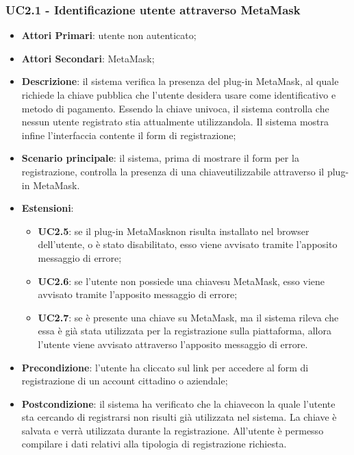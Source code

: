 \subsubsection{UC2.1 - Identificazione utente attraverso MetaMask}
\begin{itemize}
	\item \textbf{Attori Primari}: utente non autenticato;
	\item \textbf{Attori Secondari}: MetaMask\glo;
	\item \textbf{Descrizione}: il sistema verifica la presenza del plug-in MetaMask\glo, al quale richiede la chiave pubblica che l'utente desidera usare come identificativo e metodo di pagamento. Essendo la chiave univoca, il sistema controlla che nessun utente registrato stia attualmente utilizzandola. Il sistema mostra infine l'interfaccia contente il form di registrazione;
	\item \textbf{Scenario principale}: il sistema, prima di mostrare il form per la registrazione, controlla la presenza di una chiave\glosp utilizzabile attraverso il plug-in MetaMask\glosp.
	\item \textbf{Estensioni}:
	\begin{itemize}
		\item \textbf{UC2.5}: se il plug-in MetaMask\glosp non risulta installato nel browser dell'utente, o è stato disabilitato, esso viene avvisato tramite l'apposito messaggio di errore;
		\item \textbf{UC2.6}: se l'utente non possiede una chiave\glosp su MetaMask\glosp, esso viene avvisato tramite l'apposito messaggio di errore;
		\item \textbf{UC2.7}: se è presente una chiave su MetaMask\glosp, ma il sistema rileva che essa è già stata utilizzata per la registrazione sulla piattaforma, allora l'utente viene avvisato attraverso l'apposito messaggio di errore.
	\end{itemize}
	\item \textbf{Precondizione}: l'utente ha cliccato sul link per accedere al form di registrazione di un account cittadino o aziendale;
	\item \textbf{Postcondizione}: il sistema ha verificato che la chiave\glosp con la quale l'utente sta cercando di registrarsi non risulti già utilizzata nel sistema. La chiave è salvata e verrà utilizzata durante la registrazione. All'utente è permesso compilare i dati relativi alla tipologia di registrazione richiesta.
	
\end{itemize}
